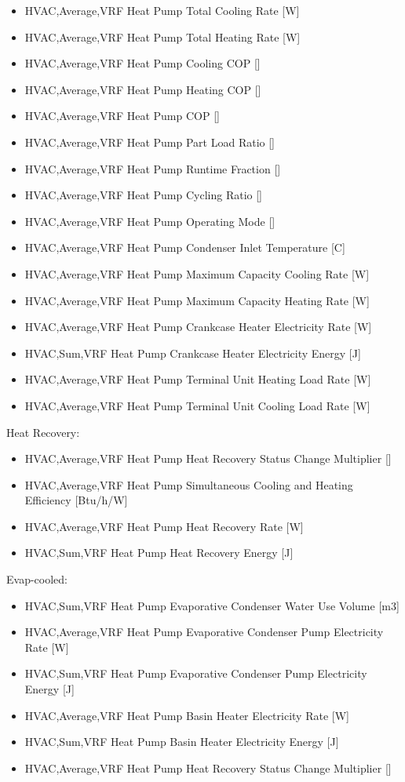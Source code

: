 \begin{itemize}
\item
  HVAC,Average,VRF Heat Pump Total Cooling Rate {[}W{]}
\item
  HVAC,Average,VRF Heat Pump Total Heating Rate {[}W{]}
\item
  HVAC,Average,VRF Heat Pump Cooling COP {[]}
\item
  HVAC,Average,VRF Heat Pump Heating COP {[]}
\item
  HVAC,Average,VRF Heat Pump COP {[]}
\item
  HVAC,Average,VRF Heat Pump Part Load Ratio {[]}
\item
  HVAC,Average,VRF Heat Pump Runtime Fraction {[]}
\item
  HVAC,Average,VRF Heat Pump Cycling Ratio {[]}
\item
  HVAC,Average,VRF Heat Pump Operating Mode {[]}
\item
  HVAC,Average,VRF Heat Pump Condenser Inlet Temperature {[}C{]}
\item
  HVAC,Average,VRF Heat Pump Maximum Capacity Cooling Rate {[}W{]}
\item
  HVAC,Average,VRF Heat Pump Maximum Capacity Heating Rate {[}W{]}
\item
  HVAC,Average,VRF Heat Pump Crankcase Heater Electricity Rate {[}W{]}
\item
  HVAC,Sum,VRF Heat Pump Crankcase Heater Electricity Energy {[}J{]}
\item
  HVAC,Average,VRF Heat Pump Terminal Unit Heating Load Rate {[}W{]}
\item
  HVAC,Average,VRF Heat Pump Terminal Unit Cooling Load Rate {[}W{]}
\end{itemize}

Heat Recovery:

\begin{itemize}
\item
  HVAC,Average,VRF Heat Pump Heat Recovery Status Change Multiplier {[]}
\item
  HVAC,Average,VRF Heat Pump Simultaneous Cooling and Heating Efficiency {[}Btu/h/W{]}
\item
  HVAC,Average,VRF Heat Pump Heat Recovery Rate {[W]}
\item
  HVAC,Sum,VRF Heat Pump Heat Recovery Energy {[J]}
\end{itemize}

Evap-cooled:

\begin{itemize}
\item
  HVAC,Sum,VRF Heat Pump Evaporative Condenser Water Use Volume {[}m3{]}
\item
  HVAC,Average,VRF Heat Pump Evaporative Condenser Pump Electricity Rate {[}W{]}
\item
  HVAC,Sum,VRF Heat Pump Evaporative Condenser Pump Electricity Energy {[}J{]}
\item
  HVAC,Average,VRF Heat Pump Basin Heater Electricity Rate {[}W{]}
\item
  HVAC,Sum,VRF Heat Pump Basin Heater Electricity Energy {[}J{]}
\item
  HVAC,Average,VRF Heat Pump Heat Recovery Status Change Multiplier {[]}
\end{itemize}

